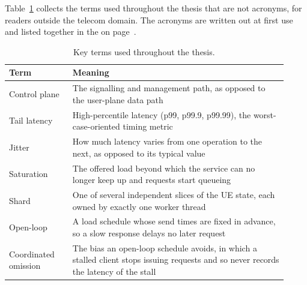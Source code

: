 \documentclass[english,oneside,a4paper,censored,csm,software-track-2020]{HYthesisML}
\begin{document}
\backmatter
\begin{appendices}

Table~\ref{tab:abbrev} collects the terms used throughout the thesis that are not acronyms, for
readers outside the telecom domain. The acronyms are written out at first use and listed together
in the \nomname{} on page~\pageref{page:acronyms}.

\begin{table}[H]
\centering
\caption[Key terms]{Key terms used throughout the thesis.\label{tab:abbrev}}
\singlespacing
\footnotesize
\renewcommand{\arraystretch}{1.2}
\begin{tabular}{@{}p{0.21\linewidth} p{0.71\linewidth}@{}}
\hline\hline
Term & Meaning \\
\hline
Control plane & The signalling and management path, as opposed to the user-plane data path \\
Tail latency & High-percentile latency (p99, p99.9, p99.99), the worst-case-oriented timing metric \\
Jitter & How much latency varies from one operation to the next, as opposed to its typical value \\
Saturation & The offered load beyond which the service can no longer keep up and requests start queueing \\
Shard & One of several independent slices of the UE state, each owned by exactly one worker thread \\
Open-loop & A load schedule whose send times are fixed in advance, so a slow response delays no later request \\
Coordinated omission & The bias an open-loop schedule avoids, in which a stalled client stops issuing requests and so never records the latency of the stall \\
\hline
\end{tabular}
\end{table}


\end{appendices}
\end{document}
